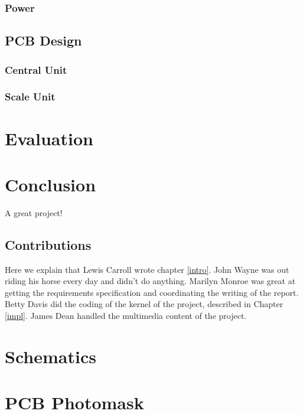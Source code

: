\documentclass{l3proj}
\begin{document}
\subsection{Power}

\section{PCB Design}
\label{pcb}

\subsection{Central Unit}

\subsection{Scale Unit}

\chapter{Evaluation}

\chapter{Conclusion}

A great project!

\section{Contributions}

Here we explain that Lewis Carroll wrote chapter \ref{intro}. John Wayne
was out riding his horse every day and didn't do anything. Marilyn Monroe
was great at getting the requirements specification and coordinating the
writing of the report. Betty Davis did the coding of the kernel of the
project, described in Chapter \ref{impl}.  James Dean handled the
multimedia content of the project.



\newpage
\appendix
\chapter{Schematics}
\chapter{PCB Photomask}




\end{document}
